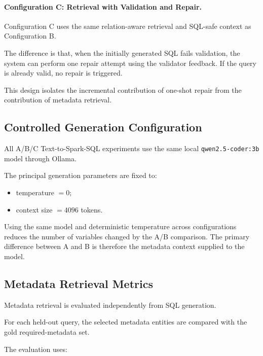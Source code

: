 \paragraph{Configuration C: Retrieval with Validation and Repair.}

Configuration C uses the same relation-aware retrieval and SQL-safe context as
Configuration B.

The difference is that, when the initially generated SQL fails validation, the
system can perform one repair attempt using the validator feedback. If the
query is already valid, no repair is triggered.

This design isolates the incremental contribution of one-shot repair from the
contribution of metadata retrieval.


\subsection{Controlled Generation Configuration}

All A/B/C Text-to-Spark-SQL experiments use the same local
\texttt{qwen2.5-coder:3b} model through Ollama.

The principal generation parameters are fixed to:

\begin{itemize}

    \item temperature \(=0\);
    \item context size \(=4096\) tokens.

\end{itemize}

Using the same model and deterministic temperature across configurations
reduces the number of variables changed by the A/B comparison. The primary
difference between A and B is therefore the metadata context supplied to the
model.


\subsection{Metadata Retrieval Metrics}

Metadata retrieval is evaluated independently from SQL generation.

For each held-out query, the selected metadata entities are compared with the
gold required-metadata set.

The evaluation uses:

